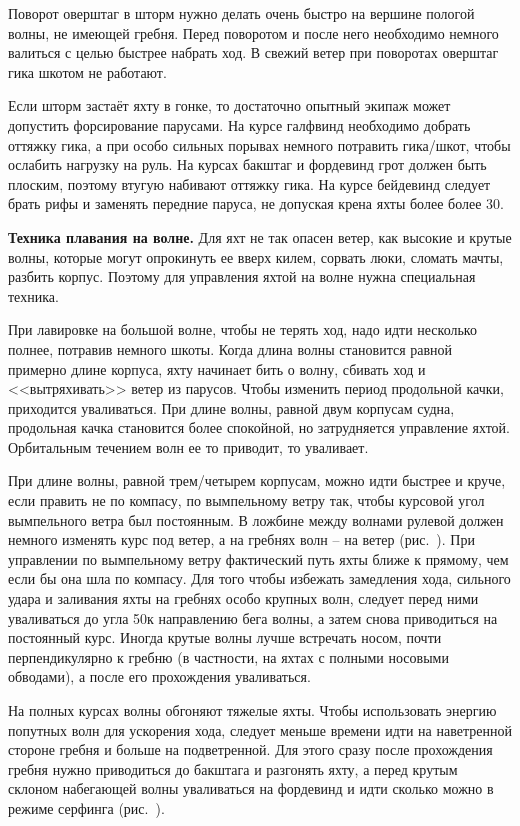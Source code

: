 Поворот оверштаг в шторм нужно делать очень быстро на вершине пологой волны, не имеющей гребня. Перед поворотом и после него необходимо немного валиться с целью быстрее набрать ход. В свежий ветер при поворотах оверштаг гика шкотом не работают.

Если шторм застаёт яхту в гонке, то достаточно опытный экипаж может допустить форсирование парусами. На курсе галфвинд необходимо добрать оттяжку гика, а при особо сильных порывах немного потравить гика\-/шкот, чтобы ослабить нагрузку на руль. На курсах бакштаг и фордевинд грот должен быть плоским, поэтому втугую набивают оттяжку гика. На курсе бейдевинд следует брать рифы и заменять передние паруса, не допуская крена яхты более более 30\gr.
 
\textbf{Техника плавания на волне.} Для яхт не так опасен ветер, как высокие и крутые волны, которые могут опрокинуть ее вверх килем, сорвать люки, сломать мачты, разбить корпус. Поэтому для управления яхтой на волне нужна специальная техника.

При лавировке на большой волне, чтобы не терять ход, надо идти несколько полнее, потравив немного шкоты. Когда длина волны становится равной примерно длине корпуса, яхту начинает бить о волну, сбивать ход и <<вытряхивать>> ветер из парусов. Чтобы изменить период продольной качки, приходится уваливаться. При длине волны, равной двум корпусам судна, продольная качка становится более спокойной, но затрудняется управление яхтой. Орбитальным течением волн ее то приводит, то уваливает.

При длине волны, равной трем\-/четырем корпусам, можно идти быстрее и круче, если править не по компасу, по вымпельному ветру так, чтобы курсовой угол вымпельного ветра был постоянным. В ложбине между волнами рулевой должен немного изменять курс под ветер, а на гребнях волн \--- на ветер (рис.~). При управлении по вымпельному ветру фактический путь яхты ближе к прямому, чем если бы она шла по компасу. Для того чтобы избежать замедления хода, сильного удара и заливания яхты на гребнях особо крупных волн, следует перед ними уваливаться до угла 50\gr к направлению бега волны, а затем снова приводиться на постоянный курс. Иногда крутые волны лучше встречать носом, почти перпендикулярно к гребню (в частности, на яхтах с полными носовыми обводами), а после его прохождения уваливаться.

На полных курсах волны обгоняют тяжелые яхты. Чтобы использовать энергию попутных волн для ускорения хода, следует меньше времени идти на наветренной стороне гребня и больше на подветренной. Для этого сразу после прохождения гребня нужно приводиться до бакштага и разгонять яхту, а перед крутым склоном набегающей волны уваливаться на фордевинд и идти сколько можно в режиме серфинга (рис.~).

